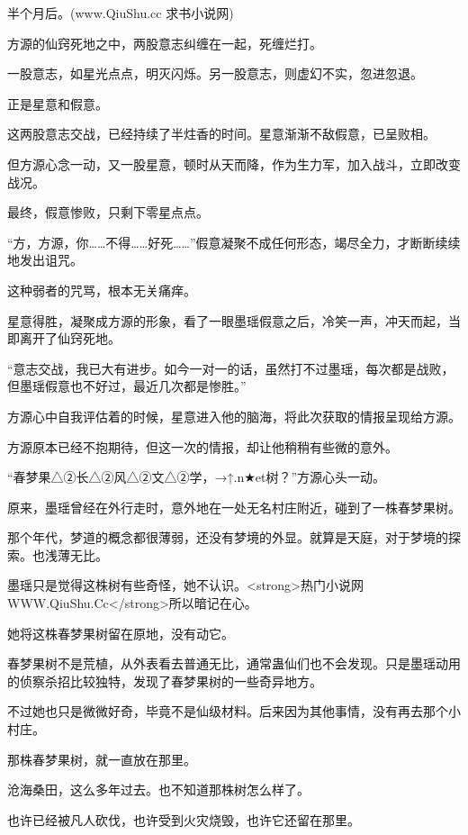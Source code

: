 
\begin{this_body}

半个月后。(www.QiuShu.cc 求书小说网)

方源的仙窍死地之中，两股意志纠缠在一起，死缠烂打。

一股意志，如星光点点，明灭闪烁。另一股意志，则虚幻不实，忽进忽退。

正是星意和假意。

这两股意志交战，已经持续了半炷香的时间。星意渐渐不敌假意，已呈败相。

但方源心念一动，又一股星意，顿时从天而降，作为生力军，加入战斗，立即改变战况。

最终，假意惨败，只剩下零星点点。

“方，方源，你……不得……好死……”假意凝聚不成任何形态，竭尽全力，才断断续续地发出诅咒。

这种弱者的咒骂，根本无关痛痒。

星意得胜，凝聚成方源的形象，看了一眼墨瑶假意之后，冷笑一声，冲天而起，当即离开了仙窍死地。

“意志交战，我已大有进步。如今一对一的话，虽然打不过墨瑶，每次都是战败，但墨瑶假意也不好过，最近几次都是惨胜。”

方源心中自我评估着的时候，星意进入他的脑海，将此次获取的情报呈现给方源。

方源原本已经不抱期待，但这一次的情报，却让他稍稍有些微的意外。

“春梦果△②长△②风△②文△②学，→↑.n★et树？”方源心头一动。

原来，墨瑶曾经在外行走时，意外地在一处无名村庄附近，碰到了一株春梦果树。

那个年代，梦道的概念都很薄弱，还没有梦境的外显。就算是天庭，对于梦境的探索。也浅薄无比。

墨瑶只是觉得这株树有些奇怪，她不认识。<strong>热门小说网WWW.QiuShu.Cc</strong>所以暗记在心。

她将这株春梦果树留在原地，没有动它。

春梦果树不是荒植，从外表看去普通无比，通常蛊仙们也不会发现。只是墨瑶动用的侦察杀招比较独特，发现了春梦果树的一些奇异地方。

不过她也只是微微好奇，毕竟不是仙级材料。后来因为其他事情，没有再去那个小村庄。

那株春梦果树，就一直放在那里。

沧海桑田，这么多年过去。也不知道那株树怎么样了。

也许已经被凡人砍伐，也许受到火灾烧毁，也许它还留在那里。


\end{this_body}
